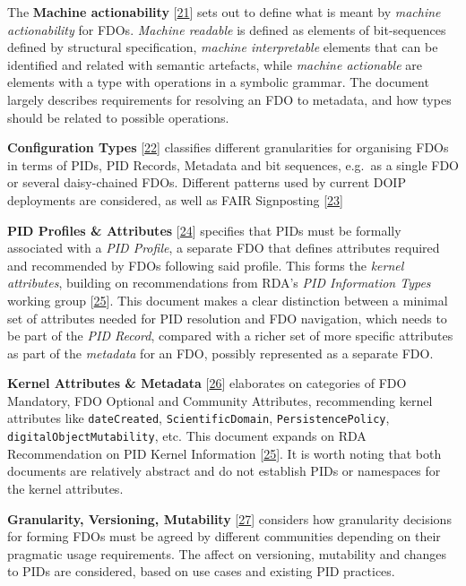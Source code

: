 The \textbf{Machine actionability} {[}\protect\hyperlink{ref-iJeys0T5}{21}{]} sets out to define what is meant by \emph{machine actionability} for FDOs. \emph{Machine readable} is defined as elements of bit-sequences defined by structural specification, \emph{machine interpretable} elements that can be identified and related with semantic artefacts, while \emph{machine actionable} are elements with a type with operations in a symbolic grammar. The document largely describes requirements for resolving an FDO to metadata, and how types should be related to possible operations.

\textbf{Configuration Types} {[}\protect\hyperlink{ref-SPd0uEqO}{22}{]} classifies different granularities for organising FDOs in terms of PIDs, PID Records, Metadata and bit sequences, e.g.~as a single FDO or several daisy-chained FDOs. Different patterns used by current DOIP deployments are considered, as well as FAIR Signposting {[}\protect\hyperlink{ref-snykkm7R}{23}{]}

\textbf{PID Profiles \& Attributes} {[}\protect\hyperlink{ref-ljVViWCl}{24}{]} specifies that PIDs must be formally associated with a \emph{PID Profile}, a separate FDO that defines attributes required and recommended by FDOs following said profile. This forms the \emph{kernel attributes}, building on recommendations from RDA's \emph{PID Information Types} working group {[}\protect\hyperlink{ref-lCoshHXg}{25}{]}. This document makes a clear distinction between a minimal set of attributes needed for PID resolution and FDO navigation, which needs to be part of the \emph{PID Record}, compared with a richer set of more specific attributes as part of the \emph{metadata} for an FDO, possibly represented as a separate FDO.

\textbf{Kernel Attributes \& Metadata} {[}\protect\hyperlink{ref-Fi62cJAo}{26}{]} elaborates on categories of FDO Mandatory, FDO Optional and Community Attributes, recommending kernel attributes like \texttt{dateCreated}, \texttt{ScientificDomain}, \texttt{PersistencePolicy}, \texttt{digitalObjectMutability}, etc. This document expands on RDA Recommendation on PID Kernel Information {[}\protect\hyperlink{ref-lCoshHXg}{25}{]}. It is worth noting that both documents are relatively abstract and do not establish PIDs or namespaces for the kernel attributes.

\textbf{Granularity, Versioning, Mutability} {[}\protect\hyperlink{ref-16W9AycSW}{27}{]} considers how granularity decisions for forming FDOs must be agreed by different communities depending on their pragmatic usage requirements. The affect on versioning, mutability and changes to PIDs are considered, based on use cases and existing PID practices.

